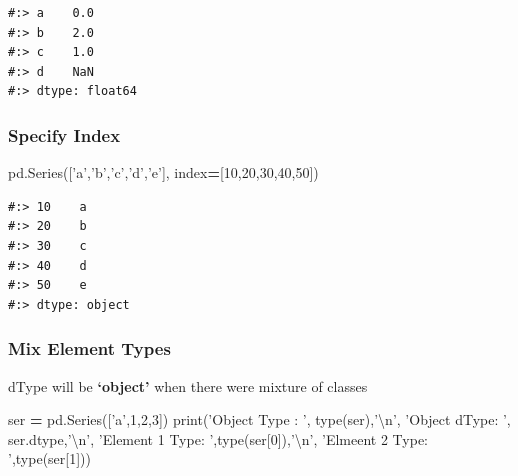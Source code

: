 \documentclass[
]{book}
\newenvironment{Shaded}{\begin{snugshade}}{\end{snugshade}}
\newcommand{\BuiltInTok}[1]{#1}
\newcommand{\CharTok}[1]{\textcolor[rgb]{0.5,0.5,0.5}{#1}}
\newcommand{\DecValTok}[1]{\textcolor[rgb]{0.06,0.06,0.06}{#1}}
\newcommand{\NormalTok}[1]{#1}
\newcommand{\OperatorTok}[1]{\textcolor[rgb]{0.43,0.43,0.43}{\textbf{#1}}}
\newcommand{\StringTok}[1]{\textcolor[rgb]{0.5,0.5,0.5}{#1}}
\begin{document}
\begin{verbatim}
#:> a    0.0
#:> b    2.0
#:> c    1.0
#:> d    NaN
#:> dtype: float64
\end{verbatim}

\hypertarget{specify-index}{%
\subsubsection{Specify Index}\label{specify-index}}

\begin{Shaded}
\begin{Highlighting}[]
\NormalTok{pd.Series([}\StringTok{'a'}\NormalTok{,}\StringTok{'b'}\NormalTok{,}\StringTok{'c'}\NormalTok{,}\StringTok{'d'}\NormalTok{,}\StringTok{'e'}\NormalTok{], index}\OperatorTok{=}\NormalTok{[}\DecValTok{10}\NormalTok{,}\DecValTok{20}\NormalTok{,}\DecValTok{30}\NormalTok{,}\DecValTok{40}\NormalTok{,}\DecValTok{50}\NormalTok{])}
\end{Highlighting}
\end{Shaded}

\begin{verbatim}
#:> 10    a
#:> 20    b
#:> 30    c
#:> 40    d
#:> 50    e
#:> dtype: object
\end{verbatim}

\hypertarget{mix-element-types}{%
\subsubsection{Mix Element Types}\label{mix-element-types}}

dType will be \textbf{`object'} when there were mixture of classes

\begin{Shaded}
\begin{Highlighting}[]
\NormalTok{ser }\OperatorTok{=}\NormalTok{ pd.Series([}\StringTok{'a'}\NormalTok{,}\DecValTok{1}\NormalTok{,}\DecValTok{2}\NormalTok{,}\DecValTok{3}\NormalTok{])}
\BuiltInTok{print}\NormalTok{(}\StringTok{'Object Type :  '}\NormalTok{, }\BuiltInTok{type}\NormalTok{(ser),}\StringTok{'}\CharTok{\textbackslash{}n}\StringTok{'}\NormalTok{,}
      \StringTok{'Object dType:  '}\NormalTok{, ser.dtype,}\StringTok{'}\CharTok{\textbackslash{}n}\StringTok{'}\NormalTok{,}
      \StringTok{'Element 1 Type: '}\NormalTok{,}\BuiltInTok{type}\NormalTok{(ser[}\DecValTok{0}\NormalTok{]),}\StringTok{'}\CharTok{\textbackslash{}n}\StringTok{'}\NormalTok{,}
      \StringTok{'Elmeent 2 Type: '}\NormalTok{,}\BuiltInTok{type}\NormalTok{(ser[}\DecValTok{1}\NormalTok{]))}
\end{Highlighting}
\end{Shaded}
\end{document}
